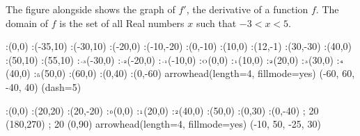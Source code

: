 \question The figure alongside shows the graph of $f'$, the derivative of a
function $f$. The domain of $f$ is the set of all Real numbers $x$ such that
$-3<x<5$.

  \begin{marginfigure}[-40pt]
      :(0,0)
      :(-35,10)
      :(-30,10)
      :(-20,0)
      :(-10,-20)
      :(0,-10)
      :(10,0)
      :(12,-1)
      :(30,-30)
      :(40,0)
      :(50,10)
      :(55,10)
      \def\Xmax{60}
      \def\Ymax{40}
      \def\Xmin{-60}
      \def\Ymin{-40}
      :$\tiny\text{-3}$(-30,0)
      :$\tiny\text{-2}$(-20,0)
      :$\tiny\text{-1}$(-10,0)
      :$\tiny\text{O}$(0,0)
      :$\tiny\text{1}$(10,0)
      :$\tiny\text{2}$(20,0)
      :$\tiny\text{3}$(30,0)
      :$\tiny\text{4}$(40,0)
      :$\tiny\text{5}$(50,0)
      :(60,0)
      :(0,40)
      :(0,-60)
    \figdrawbegin{}
      \figdrawcurve [15,20,30,40,50,61,70,80,90,95]
      \figset arrowhead(length=4, fillmode=yes)
      (\Xmin, \Xmax, \Ymin, \Ymax)
      \figset(dash=5)
      \figdrawline [201,20]
      \figdrawline [203,40]
      \figdrawline [207,70]
      \figdrawline [209,90]
    \figdrawend
    \centerline{\box\figBoxA}
  \end{marginfigure}
\ifprintanswers
  \begin{marginfigure}[200pt]
      :(0,0)
      :(20,20)%
      :(20,-20)%
      \def\Xmax{50}
      \def\Ymax{30}
      \def\Xmin{-10}
      \def\Ymin{-25}
      :$\tiny\text{0}$(0,0)
      :$\tiny\text{1}$(20,0)
      :$\tiny\text{2}$(40,0)
      :(\Xmax,0)
      :(0,\Ymax)
      :(0,-40)
    \figdrawbegin{}
       ; 20 (180,270)
       ; 20 (0,90)
      \figset arrowhead(length=4, fillmode=yes)
      (\Xmin, \Xmax, \Ymin, \Ymax)
    \figdrawend
    \centerline{\box\figBoxA}
  \end{marginfigure}
\fi 

